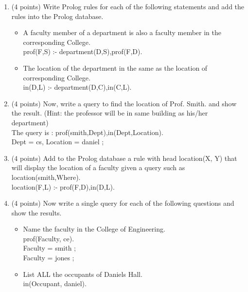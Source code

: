 \documentclass{article}%
\begin{document}
\begin{enumerate}
\begin{enumerate}
	\item (4 points) Write Prolog rules for each of the following statements and add the rules into the Prolog database.
		\begin{itemize}
		\item A faculty member of a department is also a faculty member in the corresponding College.\\
		
		prof(F,S) :- department(D,S),prof(F,D). \\
		\item The location of the department in the same as the location of corresponding College. \\
		
		in(D,L) :- department(D,C),in(C,L). \\
		\end{itemize}
	\item (4 points) Now, write a query to find the location of Prof. Smith. and show the result. (Hint: the professor will be in same building as his/her department) \\
	
	The query is : prof(smith,Dept),in(Dept,Location). \\
	
	Dept = cs,
Location = daniel ;
	
	\item (4 points) Add to the Prolog database a rule with head location(X, Y) that will display the location of a faculty given a query such as location(smith,Where).\\
	
	location(F,L) :- prof(F,D),in(D,L). \\
	\item (4 points) Now write a single query for each of the following questions and show the results.
		\begin{itemize}
		\item Name the faculty in the College of Engineering. \\
		
		prof(Faculty, ce).\\
		
		Faculty = smith ; \\

		Faculty = jones ;
		\item List ALL the occupants of Daniels Hall. \\
		
		in(Occupant, daniel).\\
		

\end{itemize}
\end{enumerate}
\end{enumerate}
\end{document}
